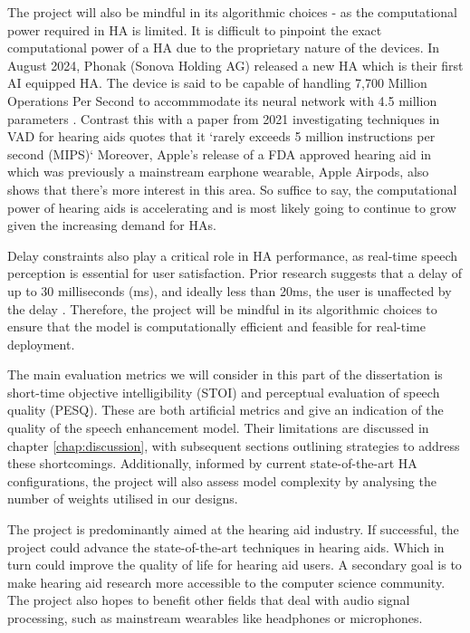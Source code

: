 \documentclass[logo,bsc,singlespacing,parskip,online]{infthesis}
\begin{document}
The project will also be mindful in its algorithmic choices - as the computational
power required in HA is limited. It is difficult to pinpoint the exact computational power of a HA
due to the proprietary nature of the devices. In August 2024,
Phonak (Sonova Holding AG) released a new HA which is their first AI 
equipped HA. The device is said to be capable of handling 7,700 Million 
Operations Per Second to accommmodate its neural network with 4.5 million parameters \cite{Hasemann2024PhonakSphere}.  Contrast this with a paper 
from 2021 investigating techniques in VAD for hearing aids 
quotes that it `rarely exceeds 5 million instructions per second (MIPS)` \cite{Gomez2021MIPS}
Moreover, Apple's release of a FDA approved hearing aid in which was previously a mainstream earphone wearable,
Apple Airpods, also shows that there's more interest in this area.
So suffice to say, the computational power of hearing aids is accelerating 
and is most likely going to continue to grow given the increasing demand 
for HAs.

Delay constraints also play a critical role in HA performance, as real-time speech perception is essential for user satisfaction.
Prior research suggests that a delay of up to 30 milliseconds (ms), and ideally less than 20ms, the user
is unaffected by the delay \cite{Stone2002Delays}. Therefore, the project will be mindful in its algorithmic choices to ensure that the model
is computationally efficient and feasible for real-time deployment.

The main evaluation metrics we will consider in this part of the dissertation 
is short-time objective intelligibility (STOI) and perceptual evaluation of speech quality (PESQ). 
These are both artificial metrics and give an indication of the quality of the speech enhancement model. 
Their limitations are discussed in chapter \ref{chap:discussion}, with subsequent sections outlining strategies to address these shortcomings.
Additionally, informed by current state-of-the-art HA configurations, the project will also assess model complexity by analysing the number of weights utilised in our designs.

The project is predominantly aimed at the hearing aid industry. If successful, the project
could advance the state-of-the-art techniques in hearing aids.
Which in turn could improve the quality of life for hearing aid users.
A secondary goal is to make hearing aid research more accessible to the 
computer science community.
The project also hopes to benefit other fields that deal with audio signal processing,
such as mainstream wearables like headphones or microphones.
\end{document}
